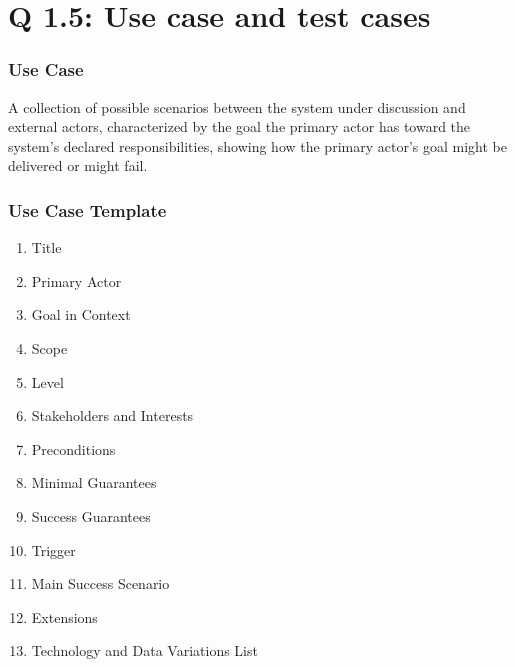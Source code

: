 
\section{Q 1.5: Use case and test cases}

\begin{frame}
    \frametitle{Use Case}
    A collection of possible scenarios between the system under discussion
    and external actors, characterized by the goal the primary actor has
    toward the system's declared responsibilities, showing how the primary
    actor's goal might be delivered or might fail.
\end{frame}

\begin{frame}[shrink]
    \frametitle{Use Case Template}
    \begin{enumerate}
        \item Title
        \item Primary Actor
        \item Goal in Context
        \item Scope
        \item Level
        \item Stakeholders and Interests
        \item Preconditions
        \item Minimal Guarantees
        \item Success Guarantees
        \item Trigger
        \item Main Success Scenario
        \item Extensions
        \item Technology and Data Variations List
    \end{enumerate}
\end{frame}

